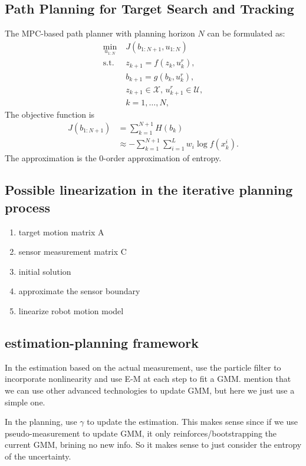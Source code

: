 \documentclass[letterpaper, 10 pt, conference]{ieeeconf}  %
\begin{document}
\subsection{Path Planning for Target Search and Tracking}
The MPC-based path planner with planning horizon $N$ can be formulated as:
\begin{subequations}
	\begin{align}
	\min_{u_{1:N}}\; & J(b_{1:N+1},u_{1:N})\\
	\text{s.t. }\; & z_{k+1}=f(z_k,u^r_k),\\
	& b_{k+1}=g(b_k,u^r_k),\\
	& z_{k+1}\in\mathcal{X}, \, u^r_{k+1}\in\mathcal{U},\\
	& k=1,\dots,N,
	\end{align}\label{eqn:MPC}
\end{subequations}
The objective function is
\begin{align}
J(b_{1:N+1})&=\sum\limits_{k=1}^{N+1} H(b_k)\\ %
& \approx -\sum\limits_{k=1}^{N+1} \sum\limits_{i=1}^{L}w_i\log f(x^i_k).
\end{align}
The approximation is the $0$-order approximation of entropy.

\subsection{Possible linearization in the iterative planning process}
\begin{enumerate}
	\item target motion matrix A
	\item sensor measurement matrix C
	\item initial solution
	\item approximate the sensor boundary
	\item linearize robot motion model
\end{enumerate}

\subsection{estimation-planning framework}
In the estimation based on the actual measurement, use the particle filter to incorporate nonlinearity and use E-M at each step to fit a GMM. mention that we can use other advanced technologies to update GMM, but here we just use a simple one.

In the planning, use $\gamma$ to update the estimation. This makes sense since if we use pseudo-measurement to update GMM, it only reinforces/bootstrapping the current GMM, brining no new info. So it makes sense to just consider the entropy of the uncertainty.
\end{document}
